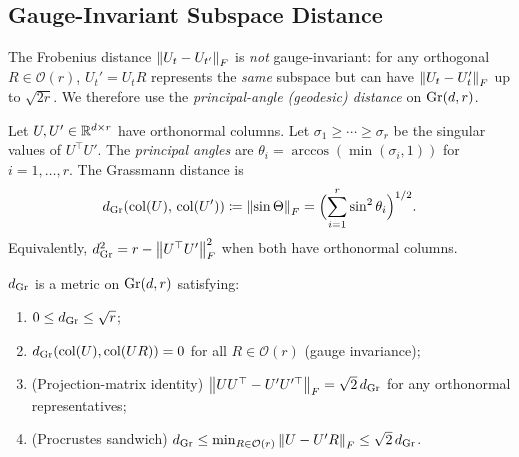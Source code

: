 \subsection{Gauge-Invariant Subspace Distance}

\begin{remark}
\label{rem:gauge}
The Frobenius distance $\left\|U_t - U_{t'}\right\|_F$ is \emph{not}
gauge-invariant: for any orthogonal $R \in \mathcal{O}(r)$,
$U_t' = U_t R$ represents the \emph{same} subspace but can have
$\left\|U_t - U_t'\right\|_F$ up to $\sqrt{2r}$.
We therefore use the \emph{principal-angle (geodesic) distance}
on $\mathrm{Gr}(d,r)$.
\end{remark}

\begin{definition}
\label{def:grassmann-dist}
Let $U, U' \in \mathbb{R}^{d \times r}$ have orthonormal columns. Let
$\sigma_1 \geq \cdots \geq \sigma_r$ be the singular values of
$U^\top U'$. The \emph{principal angles} are
$\theta_i = \arccos(\min(\sigma_i, 1))$ for $i = 1, \ldots, r$.
The Grassmann distance is
\[
  d_{\mathrm{Gr}}(\mathrm{col}(U),\, \mathrm{col}(U'))
  \coloneqq \left\|\sin \Theta\right\|_F
  = \Bigl(\sum_{i=1}^r \sin^2\theta_i\Bigr)^{1/2}.
\]
Equivalently, $d_{\mathrm{Gr}}^2 = r - \left\|U^\top U'\right\|_F^2$ when both have
orthonormal columns.
\end{definition}

\begin{lemma}
\label{lem:grassmann-props}
$d_{\mathrm{Gr}}$ is a metric on $\mathrm{Gr}(d,r)$ satisfying:
\begin{enumerate}[nosep]
  \item $0 \leq d_{\mathrm{Gr}} \leq \sqrt{r}$;
  \item $d_{\mathrm{Gr}}(\mathrm{col}(U), \mathrm{col}(UR)) = 0$ for all $R \in \mathcal{O}(r)$
        \textup{(gauge invariance)};
  \item \textup{(Projection-matrix identity)}
        $\left\|UU^\top - U'U'^\top\right\|_F = \sqrt{2}\,d_{\mathrm{Gr}}$
        for any orthonormal representatives;
  \item \textup{(Procrustes sandwich)}
        $d_{\mathrm{Gr}} \leq \min_{R \in \mathcal{O}(r)}\left\|U - U'R\right\|_F
        \leq \sqrt{2}\,d_{\mathrm{Gr}}$.
\end{enumerate}
\end{lemma}

